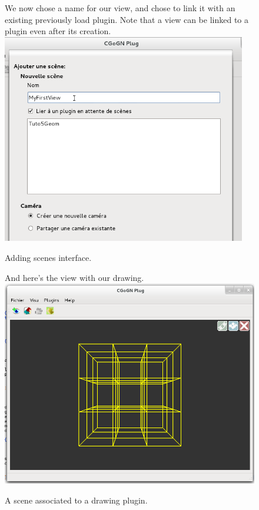 \documentclass[a4paper]{scrreprt}
\begin{document}
	\begin{figure}[h!p]
	We now chose a name for our view, and chose to link it with an existing
	previously load plugin. Note that a view can be linked to a plugin even after
	its creation.\\
	  \centering
	    \includegraphics[width=0.95\textwidth]{images/screenshot5}
	  \caption{Adding scenes interface.}
	\end{figure}
	\begin{figure}[h!p]
	And here's the view with our drawing.\\
	  \centering
	    \includegraphics[width=1\textwidth]{images/screenshot6}
	  \caption{A scene associated to a drawing plugin.}
	  \label{fig:tuto5GeomView}
	\end{figure}
\end{document}
